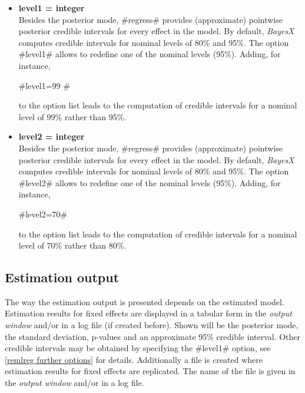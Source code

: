   
\begin{itemize}
\item \label{remlreglevel1} {\bf level1 = integer} \\
Besides the posterior mode, #regress# provides (approximate)
pointwise posterior credible intervals for every effect in the
model. By default, {\em BayesX} computes credible intervals for
nominal levels of 80\% and 95\%. The option #level1# allows to
redefine one of the nominal levels (95\%). Adding, for instance,

#level1=99 #

to the option list leads to the computation of credible intervals
for a nominal level of 99\% rather than 95\%.
\item \label{remlreglevel2} {\bf level2 = integer} \\
Besides the posterior mode, #regress# provides (approximate)
pointwise posterior credible intervals for every effect in the
model. By default, {\em BayesX} computes credible intervals for
nominal levels of 80\% and 95\%. The option #level2# allows to
redefine one of the nominal levels (95\%). Adding, for instance,

#level2=70#

to the option list leads to the computation of credible intervals
for a nominal level of 70\% rather than 80\%.
\end{itemize}

\subsection{Estimation output}

The way the estimation output is presented depends on the
estimated model. Estimation results for fixed effects are
displayed in a tabular form in the {\em output window} and/or in a
log file (if created before). Shown will be the posterior mode,
the standard deviation, p-values and an approximate 95\% credible
interval. Other credible intervals may be obtained by specifying
the #level1# option, see \autoref{remlreg further options} for
details. Additionally a file is created where estimation results
for fixed effects are replicated. The name of the file is given in
the {\em output window} and/or in a log file.


